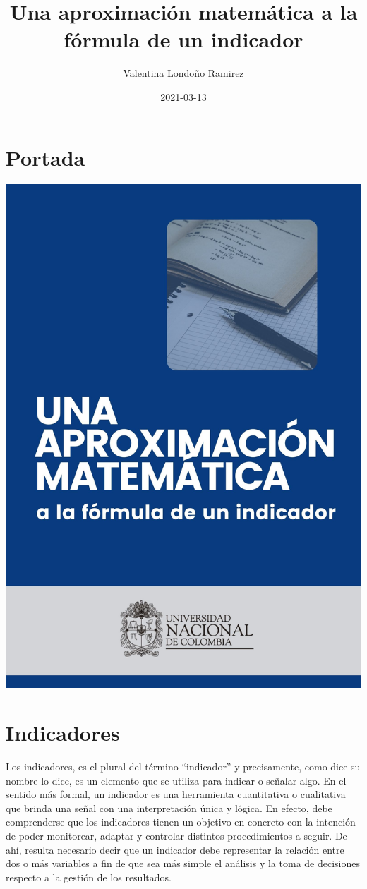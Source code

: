 \documentclass[
]{book}
\title{Una aproximación matemática a la fórmula de un indicador}
\author{Valentina Londoño Ramirez}
\date{2021-03-13}
\begin{document}
\maketitle

{
\setcounter{tocdepth}{1}
\tableofcontents
}
\hypertarget{portada}{%
\chapter*{Portada}\label{portada}}

\begin{center}\includegraphics[width=0.5\linewidth]{ProtectoR/portada} \end{center}

\hypertarget{intro}{%
\chapter{Indicadores}\label{intro}}

Los indicadores, es el plural del término ``indicador'' y precisamente, como dice su nombre lo dice, es un elemento que se utiliza para indicar o señalar algo. En el sentido más formal, un indicador es una herramienta cuantitativa o cualitativa que brinda una señal con una interpretación única y lógica. En efecto, debe comprenderse que los indicadores tienen un objetivo en concreto con la intención de poder monitorear, adaptar y controlar distintos procedimientos a seguir. De ahí, resulta necesario decir que un indicador debe representar la relación entre dos o más variables a fin de que sea más simple el análisis y la toma de decisiones respecto a la gestión de los resultados.
\end{document}
